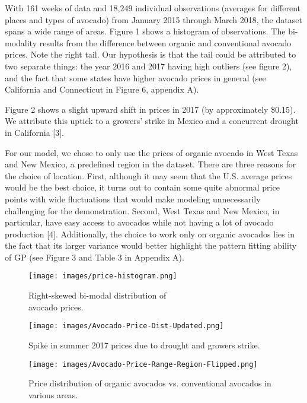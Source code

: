 \documentclass{article}
\begin{document}
    With 161 weeks of data and 18,249 individual observations (averages for different places and types of avocado) from January 2015 through March 2018, the dataset spans a wide range of areas. Figure 1 shows a histogram of observations. The bi-modality results from the difference between organic and conventional avocado prices. Note the right tail. Our hypothesis is that the tail could be attributed to two separate things: the year 2016 and 2017 having high outliers (see figure 2), and the fact that some states have higher avocado prices in general (see California and Connecticut in Figure 6, appendix A). 
    
    Figure 2 shows a slight upward shift in prices in 2017 (by approximately \$0.15). We attribute this uptick to a growers’ strike in Mexico and a concurrent drought in California [3].
    
    For our model, we chose to only use the prices of organic avocado in West Texas and New Mexico, a predefined region in the dataset. There are three reasons for the choice of location. First, although it may seem that the U.S. average prices would be the best choice, it turns out to contain some quite abnormal price points with wide fluctuations that would make modeling unnecessarily challenging for the demonstration. Second, West Texas and New Mexico, in particular, have easy access to avocados while not having a lot of avocado production [4]. Additionally, the choice to work only on organic avocados lies in the fact that its larger variance would better highlight the pattern fitting ability of GP (see Figure 3 and Table 3 in Appendix A).
    
\begin{figure}[!htb]
\begin{minipage}{0.48\textwidth}
    \centering
    \texttt{[image: images/price-histogram.png]}
    \caption{Right-skewed bi-modal distribution of \\avocado prices.}\label{Fig:Data1}
\end{minipage}\hfill
\begin{minipage}{0.48\textwidth}
    \centering
     \texttt{[image: images/Avocado-Price-Dist-Updated.png]}
    \caption{Spike in summer 2017 prices due to drought and growers strike.}\label{Fig:Data2}
\end{minipage}
\end{figure}

\begin{figure}[h!]
  \centering
  \texttt{[image: images/Avocado-Price-Range-Region-Flipped.png]}
  \caption{Price distribution of organic avocados vs. conventional avocados in various areas.}\label{Fig:Data3}
\end{figure}
\end{document}
